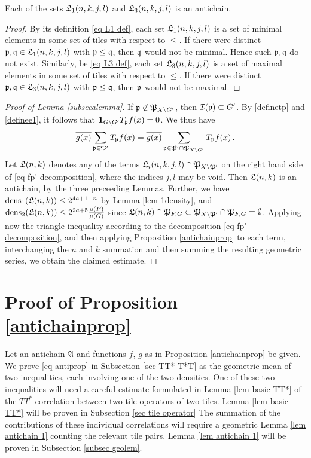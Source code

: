 \begin{lemma}
    Each of the sets $\mathfrak L_1(n,k,j,l)$ and $\mathfrak L_3(n,k,j,l)$ is an antichain.
\end{lemma}

\begin{proof}
    By its definition \eqref{eq L1 def}, each set $\mathfrak L_1(n,k,j,l)$ is a set of minimal elements in some set of tiles with respect to $\le$. If there were distinct $\mathfrak p, \mathfrak q \in \mathfrak L_1(n,k,j,l)$ with $\mathfrak p \le \mathfrak q$, then $\mathfrak q$ would not be minimal. Hence such $\mathfrak p, \mathfrak q$ do not exist. Similarly, be \eqref{eq L3 def}, each set $\mathfrak L_3(n,k,j,l)$ is a set of maximal elements in some set of tiles with respect to $\le$. If there were distinct $\mathfrak p, \mathfrak q \in \mathfrak L_3(n,k,j,l)$ with $\mathfrak p \le \mathfrak q$, then $\mathfrak p$ would not be maximal.
\end{proof}

\begin{proof}[Proof of Lemma \ref{subsecalemma}]
    If $\mathfrak p \not\in \mathfrak P_{X \setminus G'}$, then $\mathcal{I}(\mathfrak p) \subset G'$. By \eqref{definetp} and \eqref{definee1}, it follows that
    $\mathbf{1}_{G \setminus G'} T_{\mathfrak p}f(x) = 0$. We thus have
    $$
        \overline{g(x)} \sum_{\mathfrak p \in \mathfrak P'} T_{\mathfrak p}f(x) = \overline{g(x)} \sum_{\mathfrak p \in \mathfrak P' \cap \mathfrak P_{X \setminus G'}} T_{\mathfrak p}f(x)\,.
    $$
    Let $\mathfrak L(n,k)$ denotes any of the terms $\mathfrak L_i(n,k,j,l) \cap \mathfrak P_{X \setminus \mathfrak P'}$ on the right hand side of \eqref{eq fp' decomposition}, where the indices $j, l$ may be void. Then $\mathfrak L(n,k)$ is an antichain, by the three preceeding Lemmas. Further, we have $\operatorname{\operatorname{dens}}_1(\mathfrak L(n,k)) \le 2^{4a+1 - n}$ by Lemma \ref{lem 1density}, and $\operatorname{\operatorname{dens}}_2(\mathfrak L(n,k)) \le 2^{2a+5} \frac{\mu(F)}{\mu(G)}$ since $\mathfrak L(n,k) \cap \mathfrak P_{F,G} \subset \mathfrak P_{X \setminus \mathfrak P'} \cap \mathfrak P_{F, G} = \emptyset$.
    Applying now the triangle inequality according to the decomposition \eqref{eq fp' decomposition}, and then applying Proposition \ref{antichainprop} to each term, interchanging the $n$ and $k$ summation and then summing the resulting geometric series, we obtain the claimed estimate. 
\end{proof}

\chapter{Proof of  Proposition \ref{antichainprop}}

\label{antichainboundary}

Let an antichain $\mathfrak{A}$
and functions $f$, $g$ as in Proposition \ref{antichainprop} be given.
We prove \eqref{eq antiprop}
in Subsection \ref{sec TT* T*T}
as the geometric mean of two inequalities,
each involving one of the two densities.
One of these two inequalities will need a careful estimate formulated in
Lemma \ref{lem basic TT*} of
the $TT^*$ correlation between two tile operators of two tiles.
Lemma \ref{lem basic TT*} will be proven in
Subsection \ref{sec tile operator}
The summation of the contributions of these individual correlations will require a
geometric Lemma \ref{lem antichain 1} counting the relevant tile pairs.
Lemma \ref{lem antichain 1} will be proven in Subsection
\ref{subsec geolem}.






